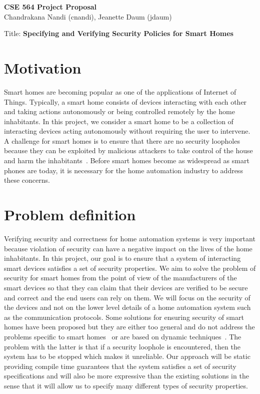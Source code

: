 \documentclass{article}
\begin{document}
\begin{center}
\LARGE\textbf {CSE 564 Project Proposal}\\
\large Chandrakana Nandi (cnandi), Jeanette Daum (jdaum)
\end{center}
\begin{center}
\large Title: \textbf{Specifying and Verifying Security Policies for Smart Homes}
\end{center}

\section{Motivation}
Smart homes are becoming popular as one of the applications of Internet of Things. Typically, a smart home consists of devices interacting with each other and taking actions autonomously or being controlled remotely by the home inhabitants. In this project, we consider a smart home to be a collection of interacting devices acting autonomously without requiring the user to intervene. A challenge for smart homes is to ensure that there are no security loopholes because they can be exploited by malicious attackers to take control of the house and harm the inhabitants~\cite{yoshi, jung}. Before smart homes become as widespread as smart phones are today, it is necessary for the home automation industry to address these concerns.

\section{Problem definition}
Verifying security and correctness for home automation systems is very important because violation of security can have a negative impact on the lives of the home inhabitants. In this project, our goal is to ensure that a system of interacting smart devices satisfies a set of security properties. We aim to solve the problem of security for smart homes from the point of view of the manufacturers of the smart devices so that they can claim that their devices are verified to be secure and correct and the end users can rely on them. 
We will focus on the security of the devices and not on the lower level details of a home automation system such as the communication protocols. Some solutions for ensuring security of smart homes have been proposed but they are either too general and do not address the problems specific to smart homes~\cite{semantec} or are based on dynamic techniques~\cite{al2000secure}. The problem with the latter is that if a security loophole is encountered, then the system has to be stopped which makes it unreliable. Our approach will be static providing compile time guarantees that the system satisfies a set of security specifications and will also be more expressive than the existing solutions in the sense that it will allow us to specify many different types of security properties.   
\end{document}
